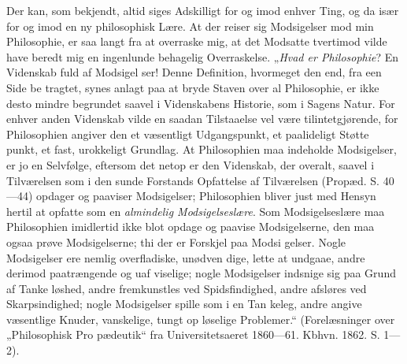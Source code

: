 \documentclass[12pt]{book}
\newcommand{\opage}[1]{\marginnote{\footnotesize\textit{[#1]}}}
\begin{document}
Der kan, som bekjendt, altid siges Adskilligt for og imod
enhver Ting, og da især for og imod en ny philosophisk Lære.
At der reiser sig Modsigelser mod min Philosophie, er
saa langt fra at overraske mig, at det Modsatte tvertimod
vilde have beredt mig en ingenlunde behagelig Overraskelse.
„\emph{Hvad er Philosophie}? En Videnskab fuld af Modsigel\-%
ser! Denne Definition, hvormeget den end, fra een Side be\-%
tragtet, synes anlagt paa at bryde Staven over al Philosophie,
er ikke desto mindre begrundet saavel i Videnskabens Historie,
som i Sagens Natur. For enhver anden Videnskab vilde en
saadan Tilstaaelse vel være tilintetgjørende, for Philosophien
angiver den et væsentligt Udgangspunkt, et paalideligt Støtte\-%
punkt, et fast, urokkeligt Grundlag. At Philosophien maa
indeholde Modsigelser, er jo en Selvfølge, eftersom det netop
er den Videnskab, der overalt, saavel i Tilværelsen som i
den sunde Forstands Opfattelse af Tilværelsen (Propæd.
S. 40---44) opdager og paaviser Modsigelser; Philosophien
bliver just med Hensyn hertil at opfatte som en \emph{almindelig
Modsigelseslære}. Som Modsigelseslære maa Philosophien
imidlertid ikke blot opdage og paavise Modsigelserne, den maa
ogsaa prøve Modsigelserne; thi der er Forskjel paa Modsi\-%
gelser. Nogle Modsigelser ere nemlig overfladiske, unødven\-%
dige, lette at undgaae, andre derimod paatrængende og uaf\-%
viselige; nogle Modsigelser indsnige sig paa Grund af Tanke\-%
løshed, andre fremkunstles ved Spidsfindighed, andre afsløres
\opage{324}\setcounter{footnote}{0}%
ved Skarpsindighed; nogle Modsigelser spille som i en Tan\-%
keleg, andre angive væsentlige Knuder, vanskelige, tungt op\-%
løselige Problemer.“ (Forelæsninger over „Philosophisk Pro\-%
pædeutik“ fra Universitetsaeret 1860---61. Kbhvn. 1862.
S. 1---2).
\end{document}
